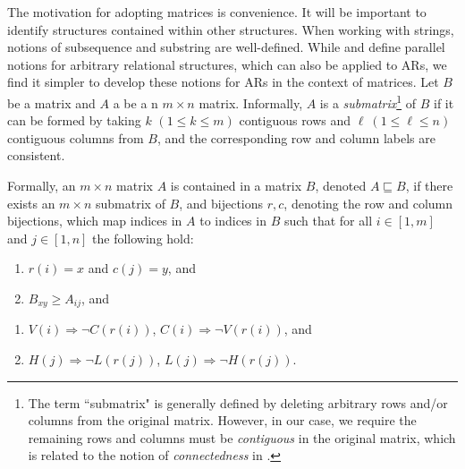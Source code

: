 \documentclass[pmlr]{jmlr}%
\begin{document}
	The motivation for adopting matrices is convenience.
	It will be important to identify structures contained within other structures.
	When working with strings, notions of subsequence and substring are well-defined.
	While \citet{chandleeBufia2019} and \citet{rogers-lambert-2019-classes}
	define parallel notions for arbitrary relational structures,
	which can also be applied to ARs,
	we find it simpler to develop these notions for ARs in the context of matrices.
	Let \(B\) be a matrix and \(A\) a be a n \(m \times n\) matrix. Informally, \(A\) is a \emph{submatrix}\footnote{The term ``submatrix" is
		generally defined by deleting arbitrary rows and/or columns from the original
		matrix. However, in our case, we require the remaining rows and columns must be
		\textit{contiguous} in the original matrix, which is related to the 
		notion of \textit{connectedness} in \citet{chandleeBufia2019}.}
	of \(B\) if it can be formed by taking \(k\) \((1 \leq k \leq m)\) contiguous rows and
	\(\ell\ (1 \leq \ell \leq n)\) contiguous columns from \(B\), and the corresponding row and column labels are consistent. 
	
	Formally, an \(m \times n\) matrix \(A\) is contained in a matrix \(B\), denoted
	\(A \sqsubseteq B\), if there exists an \(m \times n\) submatrix of
	\(B\), and bijections \(r, c\), denoting the row and column bijections, which map indices in \(A\) to indices in \(B\) such that for all \(i \in [1,m]\) and \(j \in [1,n]\) the following hold:
	
	\vspace{2ex}
	
	\begin{minipage}{0.4\linewidth}
		\begin{enumerate}\itemsep-0.5ex
			\item \(r(i)=x\) and \(c(j)=y\), and
			\item \( B_{xy} \geq A_{ij}\), and
		\end{enumerate}
	\end{minipage}\hfill
	\begin{minipage}{0.5\linewidth}
		\begin{enumerate}\itemsep-0.5ex
			\setcounter{enumi}{2}
			\item \(V(i)\Rightarrow \neg C(r(i))\), \(C(i)\Rightarrow \neg V(r(i))\), and
			\item \(H(j)\Rightarrow \neg L(r(j))\), \(L(j)\Rightarrow \neg H(r(j))\).
		\end{enumerate}
	\end{minipage}
	
\end{document}
